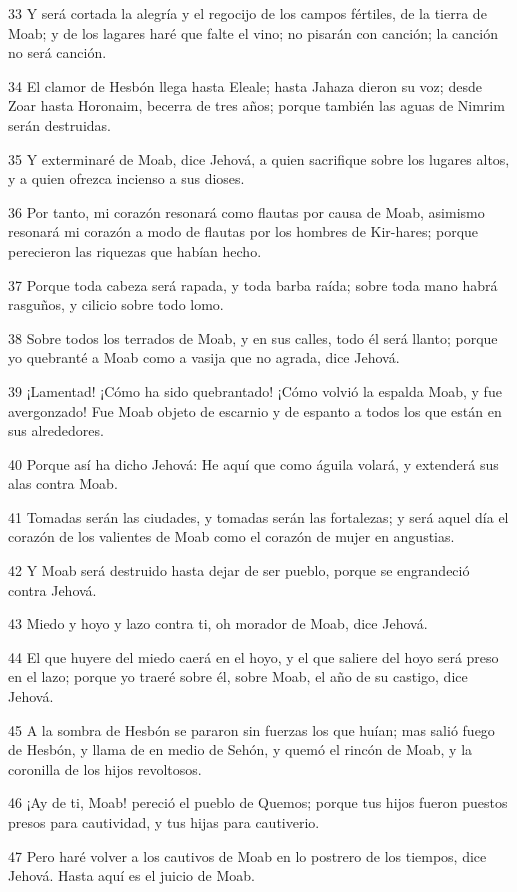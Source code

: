 \par 33 Y será cortada la alegría y el regocijo de los campos fértiles, de la tierra de Moab; y de los lagares haré que falte el vino; no pisarán con canción; la canción no será canción.
\par 34 El clamor de Hesbón llega hasta Eleale; hasta Jahaza dieron su voz; desde Zoar hasta Horonaim, becerra de tres años; porque también las aguas de Nimrim serán destruidas.
\par 35 Y exterminaré de Moab, dice Jehová, a quien sacrifique sobre los lugares altos, y a quien ofrezca incienso a sus dioses.
\par 36 Por tanto, mi corazón resonará como flautas por causa de Moab, asimismo resonará mi corazón a modo de flautas por los hombres de Kir-hares; porque perecieron las riquezas que habían hecho.
\par 37 Porque toda cabeza será rapada, y toda barba raída; sobre toda mano habrá rasguños, y cilicio sobre todo lomo.
\par 38 Sobre todos los terrados de Moab, y en sus calles, todo él será llanto; porque yo quebranté a Moab como a vasija que no agrada, dice Jehová.
\par 39 ¡Lamentad! ¡Cómo ha sido quebrantado! ¡Cómo volvió la espalda Moab, y fue avergonzado! Fue Moab objeto de escarnio y de espanto a todos los que están en sus alrededores.
\par 40 Porque así ha dicho Jehová: He aquí que como águila volará, y extenderá sus alas contra Moab.
\par 41 Tomadas serán las ciudades, y tomadas serán las fortalezas; y será aquel día el corazón de los valientes de Moab como el corazón de mujer en angustias.
\par 42 Y Moab será destruido hasta dejar de ser pueblo, porque se engrandeció contra Jehová.
\par 43 Miedo y hoyo y lazo contra ti, oh morador de Moab, dice Jehová.
\par 44 El que huyere del miedo caerá en el hoyo, y el que saliere del hoyo será preso en el lazo; porque yo traeré sobre él, sobre Moab, el año de su castigo, dice Jehová.
\par 45 A la sombra de Hesbón se pararon sin fuerzas los que huían; mas salió fuego de Hesbón, y llama de en medio de Sehón, y quemó el rincón de Moab, y la coronilla de los hijos revoltosos.
\par 46 ¡Ay de ti, Moab! pereció el pueblo de Quemos; porque tus hijos fueron puestos presos para cautividad, y tus hijas para cautiverio.
\par 47 Pero haré volver a los cautivos de Moab en lo postrero de los tiempos, dice Jehová. Hasta aquí es el juicio de Moab.


